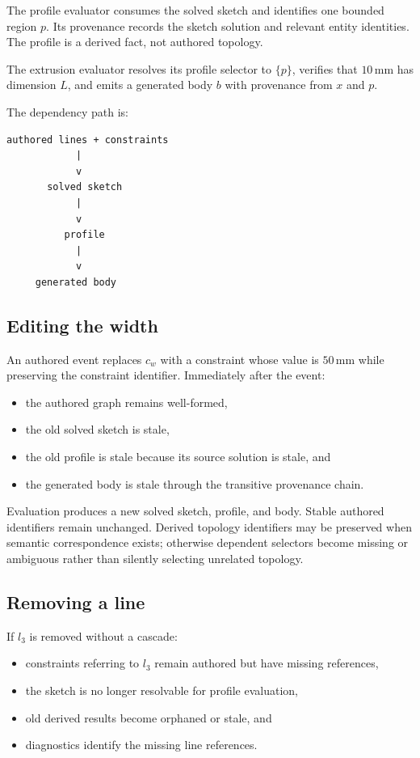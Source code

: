 \documentclass[11pt]{article}
\begin{document}
The profile evaluator consumes the solved sketch and identifies one bounded
region $p$. Its provenance records the sketch solution and relevant entity
identities. The profile is a derived fact, not authored topology.

The extrusion evaluator resolves its profile selector to $\{p\}$, verifies that
$10\,\mathrm{mm}$ has dimension $L$, and emits a generated body $b$ with
provenance from $x$ and $p$.

The dependency path is:

\begin{verbatim}
authored lines + constraints
            |
            v
       solved sketch
            |
            v
          profile
            |
            v
     generated body
\end{verbatim}

\subsection{Editing the width}

An authored event replaces $c_w$ with a constraint whose value is
$50\,\mathrm{mm}$ while preserving the constraint identifier. Immediately after
the event:

\begin{itemize}
  \item the authored graph remains well-formed,
  \item the old solved sketch is stale,
  \item the old profile is stale because its source solution is stale, and
  \item the generated body is stale through the transitive provenance chain.
\end{itemize}

Evaluation produces a new solved sketch, profile, and body. Stable authored
identifiers remain unchanged. Derived topology identifiers may be preserved
when semantic correspondence exists; otherwise dependent selectors become
missing or ambiguous rather than silently selecting unrelated topology.

\subsection{Removing a line}

If $l_3$ is removed without a cascade:

\begin{itemize}
  \item constraints referring to $l_3$ remain authored but have missing
    references,
  \item the sketch is no longer resolvable for profile evaluation,
  \item old derived results become orphaned or stale, and
  \item diagnostics identify the missing line references.
\end{itemize}
\end{document}
